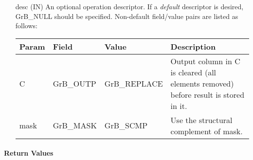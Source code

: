 \begin{itemize}[leftmargin=1.1in]
    \item[{\sf desc}] ({\sf IN}) An optional operation descriptor. If
    a \emph{default} descriptor is desired, {\sf GrB\_NULL} should be
    specified. Non-default field/value pairs are listed as follows:  \\

    \begin{tabular}{lllp{2.5in}}
        Param & Field  & Value & Description \\
        \hline
        {\sf C}    & {\sf GrB\_OUTP} & {\sf GrB\_REPLACE} &  Output column in 
        {\sf C} is cleared (all elements removed) before result is stored in it.\\
    
        {\sf mask} & {\sf GrB\_MASK} & {\sf GrB\_SCMP}   & Use the structural 
        complement of {\sf mask}. \\
    \end{tabular}

\end{itemize}

\paragraph{Return Values}

